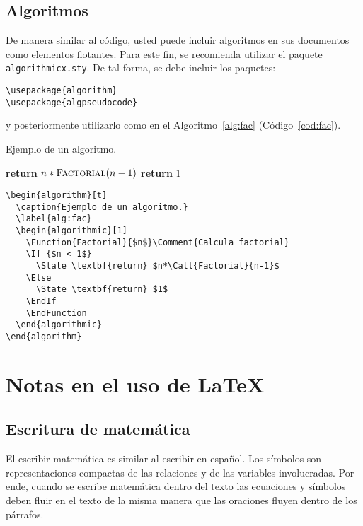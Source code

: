 \documentclass[twocolumn,11pts]{IEEEtran}
\begin{document}
\subsection{Algoritmos}

De manera similar al código, usted puede incluir algoritmos en sus documentos como elementos flotantes. Para este fin, se recomienda utilizar el paquete \texttt{algorithmicx.sty}. De tal forma, se debe incluir los paquetes:
\begin{lstlisting}[frame=none,numbers=none,basicstyle=\tt\normalsize]
\usepackage{algorithm}
\usepackage{algpseudocode}
\end{lstlisting}
y posteriormente utilizarlo como en el Algoritmo~\ref{alg:fac} (Código~\ref{cod:fac}).

\begin{algorithm}[t]
  \caption{Ejemplo de un algoritmo.}
  \label{alg:fac}
  \begin{algorithmic}[1]
      \State \textbf{return} $n*\Call{Factorial}{n-1}$
    \Else
      \State \textbf{return} $1$
    \EndIf
    \EndFunction
  \end{algorithmic}
\end{algorithm}

\begin{lstlisting}[float=tb,caption={Código que genera el Algoritmo~\ref{alg:fac}.},label=cod:fac]
\begin{algorithm}[t]
  \caption{Ejemplo de un algoritmo.}
  \label{alg:fac}
  \begin{algorithmic}[1]
    \Function{Factorial}{$n$}\Comment{Calcula factorial}
    \If {$n < 1$}
      \State \textbf{return} $n*\Call{Factorial}{n-1}$
    \Else
      \State \textbf{return} $1$
    \EndIf
    \EndFunction
  \end{algorithmic}
\end{algorithm}
\end{lstlisting}

\section{Notas en el uso de \LaTeX}
\subsection{Escritura de matemática}
El escribir matemática es similar al escribir en español. Los símbolos son representaciones compactas de las relaciones y de las variables involucradas. Por ende, cuando se escribe matemática dentro del texto las ecuaciones y símbolos deben fluir en el texto de la misma manera que las oraciones fluyen dentro de los párrafos.
\end{document}
